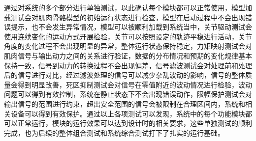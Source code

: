 通过对系统的多个部分进行单独测试，以此确认每个模块都可以正常使用，模型加载测试会对肌肉骨骼模型的初始运行状态进行检查，模型在启动过程中不会出现错误提示，也不会发生异常情况，模型可以被顺利加载到系统当中，关节驱动测试会使用连续变化的运动方式开展检验，关节可以按照设定的轨迹平稳进行活动，关节角度的变化过程不会出现明显的异常，整体运行状态保持稳定，力矩映射测试会对肌肉信号与输出动力之间的关系进行验证，数据的分布情况和预期的变化规律基本保持一致，信号到动力的转换过程不会出现偏差，信号滤波测试会对处理前和处理后的信号进行对比，经过滤波处理的信号可以减少杂乱波动的影响，信号的整体质量会得到明显改善，死区抑制测试会对信号在零值附近的波动情况进行检验，波动问题可以得到有效控制，系统在静止状态下不会出现错误动作，限幅保护测试会对输出信号的范围进行约束，超出安全范围的信号会被限制在合理区间内，系统和相关设备可以得到有效保护。通过以上各项测试可以发现，系统中的每个功能模块都可以正常运行，模块的运行效果可以达到设计时的相关要求，这些单独测试的顺利完成，也为后续的整体组合测试和系统综合测试打下了扎实的运行基础。
